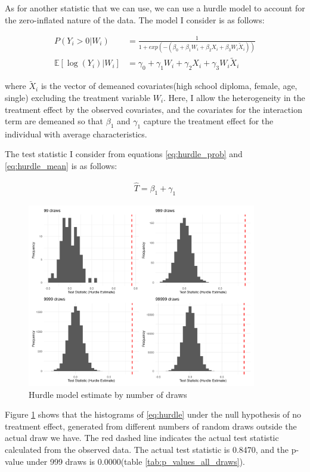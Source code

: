 \documentclass[11pt]{article}
\numberwithin{equation}{section}
\begin{document}
As for another statistic that we can use, we can use a hurdle model to account for the zero-inflated nature of the data.
The model I consider is as follows:

\begin{align}
P(Y_i > 0| W_i) &= \frac{1}{1+exp(-(\beta_0 + \beta_1 W_i + \beta_2 X_i + \beta_3 W_i \tilde{X}_i))} \label{eq:hurdle_prob}\\
\mathbb{E}\left[\log(Y_i)| W_i\right] &= \gamma_0 + \gamma_1 W_i + \gamma_2 X_i + \gamma_3 W_i \tilde{X}_i \label{eq:hurdle_mean}
\end{align}

where $\tilde{X}_i$ is the vector of demeaned covariates(high school diploma, female, age, single) excluding the treatment variable $W_i$.
Here, I allow the heterogeneity in the treatment effect by the observed covariates, and the covariates for the interaction term are demeaned so that $\beta_1$ and $\gamma_1$ capture the treatment effect for the individual with average characteristics.

The test statistic I consider from equations \ref{eq:hurdle_prob} and \ref{eq:hurdle_mean} is as follows:

\begin{align}
\hat{T} = \beta_1 + \gamma_1 \label{eq:hurdle}
\end{align}


\begin{figure}[ht]
    \centering
    \includegraphics[width=\textwidth, height=8cm]{output/histograms_hurdle_model_estimate.png}
    \caption{\label{fig:hurdle}Hurdle model estimate by number of draws}
\end{figure}

Figure \ref{fig:hurdle} shows that the histograms of \ref{eq:hurdle} under the null hypothesis of no treatment effect, generated from different numbers of random draws outside the actual draw we have. 
The red dashed line indicates the actual test statistic calculated from the observed data. 
The actual test statistic is 0.8470, and the p-value under 999 draws is 0.0000(table \ref{tab:p_values_all_draws}).
\end{document}
